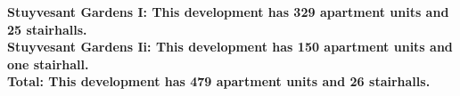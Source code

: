\bf{Stuyvesant Gardens I}: This development has 329 apartment units and 25 stairhalls.\\\bf{Stuyvesant Gardens Ii}: This development has 150 apartment units and one stairhall.\\\bf{Total}: This development has 479 apartment units and 26 stairhalls.\\